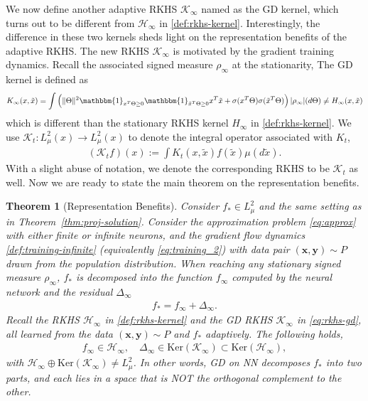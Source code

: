 \documentclass[11pt]{article}
\numberwithin{equation}{section}
\newtheorem{theorem}{Theorem}[section]
\def\bd#1{\mathbf{#1}}
\def\bx{\bd{x}}
\def\by{\bd{y}}
\begin{document}
    
    
    We now define another adaptive RKHS $\mathcal{K}_\infty$ named as the GD kernel, which turns out to be different from $\mathcal{H}_\infty$ in \eqref{def:rkhs-kernel}. Interestingly, the difference in these two kernels sheds light on the representation benefits of the adaptive RKHS. The new RKHS $\mathcal{K}_\infty$ is motivated by the gradient training dynamics. Recall the associated signed measure $\rho_\infty$ at the stationarity, The GD kernel is defined as
        \begin{align}
            \label{eq:rkhs-gd}
            K_\infty(x, \tilde{x}) = \int \left(\|\Theta\|^2\mathbbm{1}_{x^T\Theta\geq0}\mathbbm{1}_{\tilde x^T\Theta\geq0}x^T \tilde x + \sigma(x^T\Theta)\sigma(\tilde x^T\Theta) \right) |\rho_\infty|(d\Theta) \neq H_\infty(x, \tilde{x})
        \end{align}
        which is different than the stationary RKHS kernel $H_\infty$ in \eqref{def:rkhs-kernel}.
        We use $\mathcal{K}_t: L^2_\mu(x) \rightarrow L^2_\mu(x)$ to denote the integral operator associated with $K_t$,
        \begin{align*}
            (\mathcal{K}_t f)(x) := \int  K_t( x, \tilde{x} ) f(\tilde{x})\mu(d\tilde{x}).
        \end{align*}
        With a slight abuse of notation, we denote the corresponding RKHS to be $\mathcal{K}_t$ as well. Now we are ready to state the main theorem on the representation benefits.

    \begin{theorem}[Representation Benefits]
        \label{thm:gap-decomposition}
        Consider $f_* \in L^2_\mu$ and the same setting as in Theorem~\ref{thm:proj-solution}. %
    Consider the approximation problem \eqref{eq:approx} with either finite or infinite neurons, and the gradient flow dynamics \eqref{def:training-infinite} (equivalently \eqref{eq:training_2}) with data pair $(\bx, \by)\sim P$ drawn from the population distribution.
    When reaching any stationary signed measure $\rho_{\infty}$, $f_*$ is decomposed into the function $f_\infty$ computed by the neural network and the residual $\Delta_\infty$
    \begin{align*}
        f_* = f_{\infty} + \Delta_\infty.
    \end{align*}
    Recall the RKHS $\mathcal{H}_\infty$ in \eqref{def:rkhs-kernel} and the GD RKHS $\mathcal{K}_\infty$ in \eqref{eq:rkhs-gd}, all learned from the data $(\bx, \by)\sim P$ and $f_*$ adaptively. The following holds,
    \begin{align*}
        f_\infty \in \mathcal{H}_\infty, \quad
        \Delta_\infty \in \text{Ker}(\mathcal{K}_{\infty}) \subset \text{Ker}(\mathcal{H}_\infty),
    \end{align*}
    with $\mathcal{H}_\infty \oplus \text{Ker}(\mathcal{K}_\infty) \neq L^2_\mu$.
    In other words, GD on NN decomposes $f_*$ into two parts, and each lies in a space that is NOT the orthogonal complement to the other.
    \end{theorem}
\end{document}
